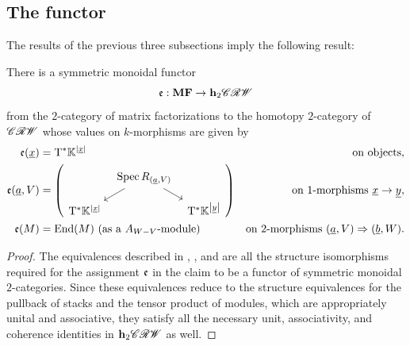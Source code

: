 \subsection{The functor}

The results of the previous three subsections imply the following result:
\begin{thm} \label{thm:main}
	There is a symmetric monoidal functor
	\begin{equation*}
		\mathfrak{e} : \mathbf{MF} \to \mathbf{h}_2 \mathscr{CRW}
	\end{equation*}
	from the $2$-category of matrix factorizations to the homotopy $2$-category of $\mathscr{CRW}$ whose values on $k$-morphisms are given by
	\begin{align*}
		\fe(\undl{x}) & = \bT^\ast \KK^{\vnorm{\undl{x}}} & \text{on objects}, \\
		\fe(\undl{a}, V) & = \left(
		{\begin{tikzcd}[ampersand replacement = \&, column sep=tiny, row sep = small]
			\& \Spec R_{(\undl{a}, V)} \ar[dr] \ar[dl] \& \\
			\bT^\ast \KK^{\vnorm{\undl{x}}} \& \& \bT^\ast \KK^{\vnorm{\undl{y}}}
		\end{tikzcd}}
		\right)
		& \text{on $1$-morphisms $\undl{x} \to \undl{y}$}, \\
		\fe(M) & = \End(M) \text{ (as a $A_{W - V}$-module)} & \text{on $2$-morphisms $(\undl{a}, V) \Rightarrow (\undl{b}, W)$}.
	\end{align*}
\end{thm}

\begin{proof}
	The equivalences described in , , and  are all the structure isomorphisms required for the assignment $\mathfrak{e}$ in the claim to be a functor of symmetric monoidal $2$-categories. Since these equivalences reduce to the structure equivalences for the pullback of stacks and the tensor product of modules, which are appropriately unital and associative, they satisfy all the necessary unit, associativity, and coherence identities in $\mathbf{h}_2 \mathscr{CRW}$ as well.
\end{proof}

